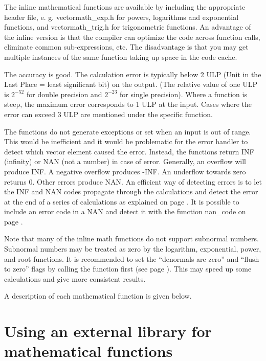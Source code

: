 \documentclass[vcl_manual.tex]{subfiles}
\begin{document}
The inline mathematical functions are available by including the appropriate header file, e. g. vectormath\_exp.h for powers, logarithms and exponential functions, and vectormath\_trig.h for trigonometric functions. An advantage of the inline version is that the compiler can optimize the code across function calls, eliminate common sub-expressions, etc. The disadvantage is that you may get multiple instances of the same function taking up space in the code cache.

The accuracy is good. The calculation error is typically below 2 ULP (Unit in the Last Place = least significant bit) on the output. (The relative value of one ULP is $2^{-52}$ for double precision and $2^{-23}$ for single precision). Where a function is steep, the maximum error corresponds to 1 ULP at the input. 
Cases where the error can exceed 3 ULP are mentioned under the specific function.

The functions do not generate exceptions or set  when an input is out of range. This would be inefficient and it would be problematic for the error handler to detect which vector element caused the error. Instead, the functions return INF (infinity) or NAN (not a number) in case of error. Generally, an overflow will produce INF. A negative overflow produces -INF. An underflow towards zero returns 0. Other errors produce NAN. An efficient way of detecting errors is to let the INF and NAN codes propagate through the calculations and detect the error at the end of a series of calculations as explained on page \pageref{FloatingPointErrors}. It is possible to include an error code in a NAN and detect it with the function nan\_code on page \pageref{nanCode}.

Note that many of the inline math functions do not support subnormal numbers. Subnormal numbers may be treated as zero by the logarithm, exponential, power, and root functions. It is recommended to set the “denormals are zero” and “flush to zero” flags by calling the function  first (see page \pageref{noSubnormals}). This may speed up some calculations and give more consistent results.

A description of each mathematical function is given below.


\section{Using an external library for mathematical functions}\label{ExternalMathLibrary}
\end{document}
